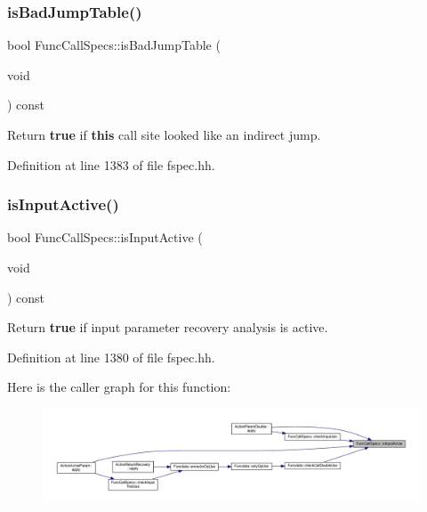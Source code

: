 \subsubsection{\texorpdfstring{isBadJumpTable()}{isBadJumpTable()}}
{\footnotesize\ttfamily bool Func\+Call\+Specs\+::is\+Bad\+Jump\+Table (\begin{DoxyParamCaption}\item[{void}]{ }\end{DoxyParamCaption}) const\hspace{0.3cm}{\ttfamily [inline]}}



Return {\bfseries{true}} if {\bfseries{this}} call site looked like an indirect jump. 



Definition at line 1383 of file fspec.\+hh.

\mbox{\label{class_func_call_specs_a4145c5e63b80ece45a2a4f0fd5949138}} 
\subsubsection{\texorpdfstring{isInputActive()}{isInputActive()}}
{\footnotesize\ttfamily bool Func\+Call\+Specs\+::is\+Input\+Active (\begin{DoxyParamCaption}\item[{void}]{ }\end{DoxyParamCaption}) const\hspace{0.3cm}{\ttfamily [inline]}}



Return {\bfseries{true}} if input parameter recovery analysis is active. 



Definition at line 1380 of file fspec.\+hh.

Here is the caller graph for this function\+:
\nopagebreak
\begin{figure}[H]
\begin{center}
\leavevmode
\includegraphics[width=350pt]{class_func_call_specs_a4145c5e63b80ece45a2a4f0fd5949138_icgraph}
\end{center}
\end{figure}
\mbox{\label{class_func_call_specs_a81e8386ebb901a273ef40d8e8430fb57}} 
